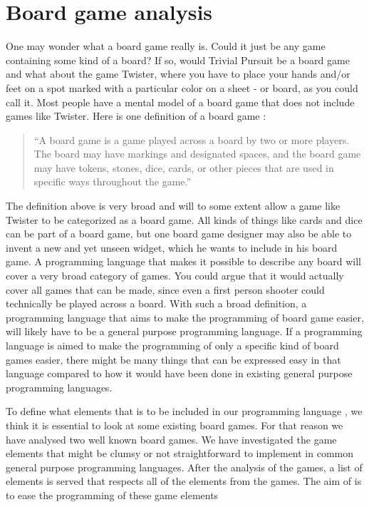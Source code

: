 \section{Board game analysis}
\label{sec:board-game-analysis}

One may wonder what a board game really is. Could it just be any game
containing some kind of a board? If so, would Trivial Pursuit be a board
game and what about the game Twister, where you have to place your hands
and/or feet on a spot marked with a particular color on a sheet - or
board, as you could call it. Most people have a mental model of a board
game that does not include games like Twister. Here is one definition of
a board game \cite{def-board-game}:

\begin{quote}
  ``A board game is a game played across a board by two or
  more players. The board may have markings and designated spaces, and the
  board game may have tokens, stones, dice, cards, or other pieces that
  are used in specific ways throughout the game.''
\end{quote}

The definition above is very broad and will to some extent allow a game
like Twister to be categorized as a board game. All kinds of things
like cards and dice can be part of a board game, but one board game
designer may also be able to invent a new and yet unseen widget, which
he wants to include in his board game. A programming language that makes
it possible to describe any board will cover a very broad category of
games. You could argue that it would actually cover all games that can
be made, since even a first person shooter could technically be played across a
board. With such a broad definition, a programming language that aims
to make the programming of board game easier, will likely have to be a general purpose programming language. If a programming
language is aimed to make the programming of only a specific kind of
board games easier, there might be many things that can be expressed easy in that language compared 
to how it would have been done in existing general purpose programming languages.

To define what elements that is to be included in our programming language \productname{}, we think it is essential to look at some existing board games. For that reason we have analysed two well known board games. We have investigated the game elements that might be clumsy or not straightforward to implement in common general purpose programming languages. After the analysis of the games, a list of elements is served that respects all of the elements from the games. The aim of \productname{} is to ease the programming of these game elements
